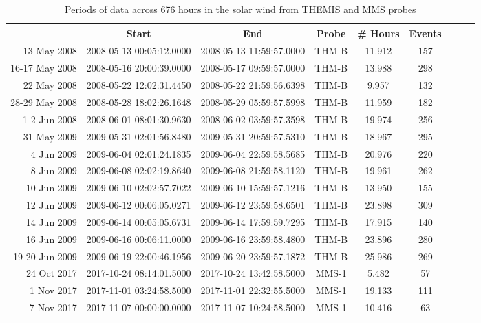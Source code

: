 \begin{longtable}{r|cccccccc}
\caption{Periods of data across 676 hours in the solar wind from THEMIS and MMS probes} \\
\hline
{} &                     Start &                       End &  Probe &  \# Hours & Events \\
\hline
13 May 2008    &  2008-05-13 00:05:12.0000 &  2008-05-13 11:59:57.0000 &  THM-B &   11.912 &    157 \\
16-17 May 2008 &  2008-05-16 20:00:39.0000 &  2008-05-17 09:59:57.0000 &  THM-B &   13.988 &    298 \\
22 May 2008    &  2008-05-22 12:02:31.4450 &  2008-05-22 21:59:56.6398 &  THM-B &    9.957 &    132 \\
28-29 May 2008 &  2008-05-28 18:02:26.1648 &  2008-05-29 05:59:57.5998 &  THM-B &   11.959 &    182 \\
1-2 Jun 2008   &  2008-06-01 08:01:30.9630 &  2008-06-02 03:59:57.3598 &  THM-B &   19.974 &    256 \\
31 May 2009    &  2009-05-31 02:01:56.8480 &  2009-05-31 20:59:57.5310 &  THM-B &   18.967 &    295 \\
4 Jun 2009     &  2009-06-04 02:01:24.1835 &  2009-06-04 22:59:58.5685 &  THM-B &   20.976 &    220 \\
8 Jun 2009     &  2009-06-08 02:02:19.8640 &  2009-06-08 21:59:58.1120 &  THM-B &   19.961 &    262 \\
10 Jun 2009    &  2009-06-10 02:02:57.7022 &  2009-06-10 15:59:57.1216 &  THM-B &   13.950 &    155 \\
12 Jun 2009    &  2009-06-12 00:06:05.0271 &  2009-06-12 23:59:58.6501 &  THM-B &   23.898 &    309 \\
14 Jun 2009    &  2009-06-14 00:05:05.6731 &  2009-06-14 17:59:59.7295 &  THM-B &   17.915 &    140 \\
16 Jun 2009    &  2009-06-16 00:06:11.0000 &  2009-06-16 23:59:58.4800 &  THM-B &   23.896 &    280 \\
19-20 Jun 2009 &  2009-06-19 22:00:46.1956 &  2009-06-20 23:59:57.1872 &  THM-B &   25.986 &    269 \\
24 Oct 2017    &  2017-10-24 08:14:01.5000 &  2017-10-24 13:42:58.5000 &  MMS-1 &    5.482 &     57 \\
1 Nov 2017     &  2017-11-01 03:24:58.5000 &  2017-11-01 22:32:55.5000 &  MMS-1 &   19.133 &    111 \\
7 Nov 2017     &  2017-11-07 00:00:00.0000 &  2017-11-07 10:24:58.5000 &  MMS-1 &   10.416 &     63 \\

\end{longtable}
